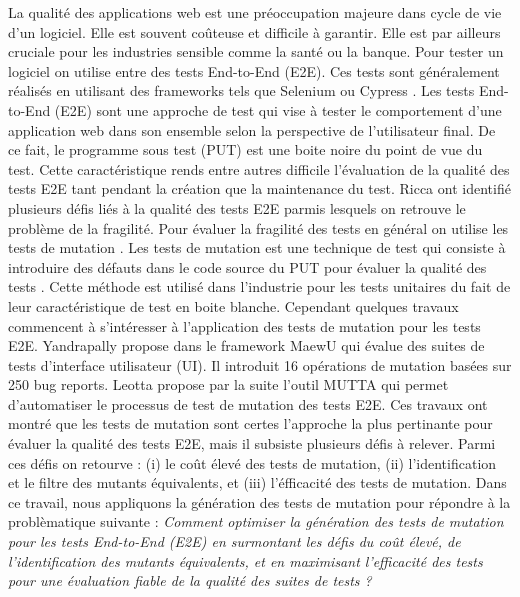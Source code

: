 \label{sec:introduction}

La qualité des applications web est une préoccupation majeure dans cycle de
vie d'un logiciel. Elle est souvent coûteuse et difficile à garantir. Elle
est par ailleurs cruciale pour les industries sensible comme la santé ou la
banque. Pour tester un logiciel on utilise entre des tests End-to-End (E2E). Ces tests sont généralement réalisés en utilisant des
frameworks tels que Selenium ou Cypress \cite{cerioli20205}. Les tests End-to-End (E2E) sont une approche de test qui vise à tester
le comportement d'une application web dans son ensemble selon la perspective de
l'utilisateur final. De ce fait, le programme sous test (PUT) est une boite
noire du point de vue du test. Cette caractéristique rends entre autres difficile
l'évaluation de la qualité des tests E2E tant pendant la création que la
maintenance du test. Ricca \etal \cite{ricca2019three} ont identifié plusieurs
défis liés à la qualité des tests E2E parmis lesquels on retrouve le problème de
la fragilité. Pour évaluer la fragilité des tests en général on utilise les tests de mutation \cite{hamimoune2016mutation}. Les tests de mutation est une
technique de test qui consiste à introduire des défauts dans le code source du
PUT pour évaluer la qualité des tests \cite{woodward1993mutation}. Cette méthode est utilisé dans
l'industrie pour les tests unitaires du fait de leur caractéristique de test en
boite blanche. Cependant quelques travaux commencent à s'intéresser à
l'application des tests de mutation pour les tests E2E. Yandrapally \etal
\cite{yandrapally2021mutation} propose dans le framework MaewU qui évalue des
suites de tests d'interface utilisateur (UI). Il introduit 16 opérations de mutation basées
sur 250 bug reports. Leotta \etal \cite{leotta2024mutta} propose par la suite l'outil
MUTTA qui permet d'automatiser le processus de test de mutation des tests E2E.
Ces travaux ont montré que les tests de mutation sont certes l'approche la plus
pertinante pour évaluer la qualité des tests E2E, mais il subsiste plusieurs défis
à relever. Parmi ces défis on retourve : (i) le coût élevé des tests de
mutation, (ii) l'identification et le filtre des mutants équivalents, et (iii)
l'éfficacité des tests de mutation. Dans ce travail, nous appliquons la génération des tests de mutation pour répondre à la problèmatique suivante : \textit{Comment optimiser la génération des tests de mutation pour les tests End-to-End (E2E) en surmontant les défis du coût élevé, de l’identification des mutants équivalents, et en maximisant l’efficacité des tests pour une évaluation fiable de la qualité des suites de tests ?}

